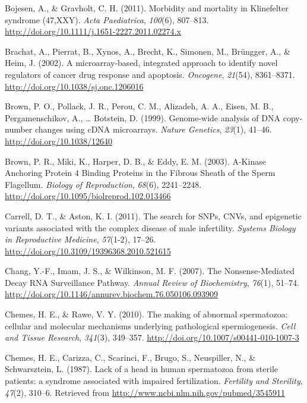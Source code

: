 \documentclass[12pt,twoside]{reedthesis}
\theoremstyle{definition}
\theoremstyle{definition}
\theoremstyle{remark}
\begin{document}
  \hypertarget{ref-Bojesen2011}{}
  Bojesen, A., \& Gravholt, C. H. (2011). Morbidity and mortality in
  Klinefelter syndrome (47,XXY). \emph{Acta Paediatrica}, \emph{100}(6),
  807--813. \url{http://doi.org/10.1111/j.1651-2227.2011.02274.x}
  
  \hypertarget{ref-Brachat2002}{}
  Brachat, A., Pierrat, B., Xynos, A., Brecht, K., Simonen, M., Brüngger,
  A., \& Heim, J. (2002). A microarray-based, integrated approach to
  identify novel regulators of cancer drug response and apoptosis.
  \emph{Oncogene}, \emph{21}(54), 8361--8371.
  \url{http://doi.org/10.1038/sj.onc.1206016}
  
  \hypertarget{ref-Brown1999}{}
  Brown, P. O., Pollack, J. R., Perou, C. M., Alizadeh, A. A., Eisen, M.
  B., Pergamenschikov, A., \ldots{} Botstein, D. (1999). Genome-wide
  analysis of DNA copy-number changes using cDNA microarrays. \emph{Nature
  Genetics}, \emph{23}(1), 41--46. \url{http://doi.org/10.1038/12640}
  
  \hypertarget{ref-Brown2003}{}
  Brown, P. R., Miki, K., Harper, D. B., \& Eddy, E. M. (2003). A-Kinase
  Anchoring Protein 4 Binding Proteins in the Fibrous Sheath of the Sperm
  Flagellum. \emph{Biology of Reproduction}, \emph{68}(6), 2241--2248.
  \url{http://doi.org/10.1095/biolreprod.102.013466}
  
  \hypertarget{ref-Carrell2011}{}
  Carrell, D. T., \& Aston, K. I. (2011). The search for SNPs, CNVs, and
  epigenetic variants associated with the complex disease of male
  infertility. \emph{Systems Biology in Reproductive Medicine},
  \emph{57}(1-2), 17--26.
  \url{http://doi.org/10.3109/19396368.2010.521615}
  
  \hypertarget{ref-Chang2007}{}
  Chang, Y.-F., Imam, J. S., \& Wilkinson, M. F. (2007). The
  Nonsense-Mediated Decay RNA Surveillance Pathway. \emph{Annual Review of
  Biochemistry}, \emph{76}(1), 51--74.
  \url{http://doi.org/10.1146/annurev.biochem.76.050106.093909}
  
  \hypertarget{ref-Chemes2010}{}
  Chemes, H. E., \& Rawe, V. Y. (2010). The making of abnormal
  spermatozoa: cellular and molecular mechanisms underlying pathological
  spermiogenesis. \emph{Cell and Tissue Research}, \emph{341}(3),
  349--357. \url{http://doi.org/10.1007/s00441-010-1007-3}
  
  \hypertarget{ref-Chemes1987}{}
  Chemes, H. E., Carizza, C., Scarinci, F., Brugo, S., Neuspiller, N., \&
  Schwarsztein, L. (1987). Lack of a head in human spermatozoa from
  sterile patients: a syndrome associated with impaired fertilization.
  \emph{Fertility and Sterility}, \emph{47}(2), 310--6. Retrieved from
  \url{http://www.ncbi.nlm.nih.gov/pubmed/3545911}
  
\end{document}
